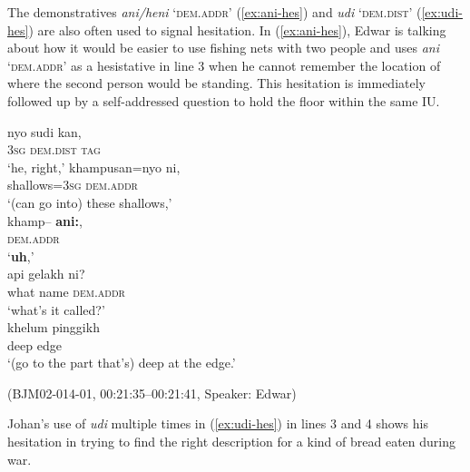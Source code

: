 \documentclass[output=paper,colorlinks,citecolor=brown
\ChapterDOI{10.5281/zenodo.15697585}
]{langscibook}
\begin{document}
The demonstratives \textit{ani/heni} `\textsc{dem.addr}' (\ref{ex:ani-hes}) and \textit{udi} `\textsc{dem.dist}' (\ref{ex:udi-hes}) are also often used to signal hesitation. In (\ref{ex:ani-hes}), Edwar is talking about how it would be easier to use fishing nets with two people and uses \textit{ani} `\textsc{dem.addr}' as a hesistative in line 3 when he cannot remember the location of where the second person would be standing. This hesitation is immediately followed up by a self-addressed question to hold the floor within the same IU.

\begin{exe}
    \ex\label{ex:ani-hes} \begin{xlist}[0\quad →A:]
         \gll
        nyo sudi kan, \\
        3\textsc{sg} \textsc{dem.dist} \textsc{tag} \\
        \glt `he, right,'
        \exi{2\quad \hphantom{→E:}} \gll
        khampusan=nyo ni, \\
        shallows=3\textsc{sg} \textsc{dem.addr} \\
        \glt `(can go into) these shallows,' \\
         \gll
        khamp-- \textbf{ani:}, \\
        {} \textsc{dem.addr} \\
        \glt `\textbf{uh},' \\
        \exi{4\quad \hphantom{→E:}} \gll
        api gelakh ni? \\
        what name \textsc{dem.addr}\\
        \glt `what's it called?' \\
        \exi{5\quad \hphantom{→E:}} \gll
        khelum pinggikh \\
        deep edge \\
        \glt `(go to the part that's) deep at the edge.' \\
    \end{xlist}
    \hfill (BJM02-014-01, 00:21:35–00:21:41, Speaker: Edwar) 
\end{exe}

Johan's use of \textit{udi} multiple times in (\ref{ex:udi-hes}) in lines 3 and 4 shows his hesitation in trying to find the right description for a kind of bread eaten during war.
\end{document}
